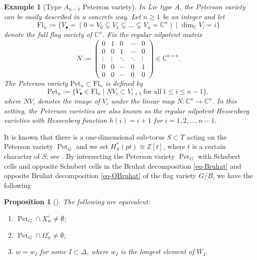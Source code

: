 \documentclass[11pt, letterpaper]{amsart}
\numberwithin{equation}{section}
\newtheorem{proposition}[theorem]{Proposition}
\newtheorem{eg}[theorem]{Example}
\DeclareMathOperator{\Pet}{Pet}
\begin{document}
\begin{eg}[Type $A_{n-1}$ Peterson variety] \label{ex:typeA}
In Lie type $A$, the Peterson variety can be easily described in a concrete way. Let $n\ge 1$ be an integer and let
\[
\mathrm{Fl}_n:=\bigl\{V_\bullet=(0=V_0\subsetneq V_1\subsetneq \dots \subsetneq V_n=\mathbb C^n)\mid \dim_{\mathbb C}V_i=i\bigr\}
\]
denote the full flag variety of $\mathbb C^n$.  Fix the regular nilpotent matrix
\[
N:=
\begin{pmatrix}
0&1&0&\cdots&0\\
0&0&1&\cdots&0\\
\vdots&\vdots&\ddots&\ddots&\vdots\\
0&0&\cdots&0&1\\
0&0&\cdots&0&0
\end{pmatrix}\in\mathbb C^{n\times n}.
\]
The Peterson variety $\mathrm{Pet}_n\subset\mathrm{Fl}_n$ is defined by
\[
\mathrm{Pet}_n:=\bigl\{V_\bullet\in\mathrm{Fl}_n\mid NV_i\subset V_{i+1}\ \text{for all}\ 1\le i\le n-1\bigr\},
\]
where $NV_i$ denotes the image of $V_i$ under the linear map $N\colon\mathbb C^n\to\mathbb C^n$.
In this setting, the Peterson varieties are also known as the \emph{regular nilpotent} Hessenberg varieties with \emph{Hessenberg function} $h(i)=i+1$ for $i=1,2, \ldots, n-1$.
\end{eg}

It is known that there is a one-dimensional sub-torus $S\subset T$ acting on the Peterson variety $\Pet_G$ and we set $H_S^*(p t)\cong\mathbb{Z}[t]$, where $t$ is a certain character of $S$; see \cite[Section 3.2]{Goldin2024positivity}. By intersecting the Peterson variety $\Pet_G$ with Schubert cells and opposite Schubert cells in the Bruhat decomposition \eqref{eq-Bruhat} and opposite Bruhat decomposition \eqref{eq-OBruhat} of the flag variety $G/B$, we have the following 

\begin{proposition}[]
    The following are equivalent:
\begin{enumerate}
    \item $\Pet_G \cap X_w^\circ \neq \emptyset$;
    \item $\Pet_G \cap  \Omega_w^\circ\neq \emptyset$;
    \item $w = w_I$ for some $I \subset \Delta$,
where $w_{I}$ is the longest element of $W_{I}$.
\end{enumerate}
\end{proposition}
\end{document}
